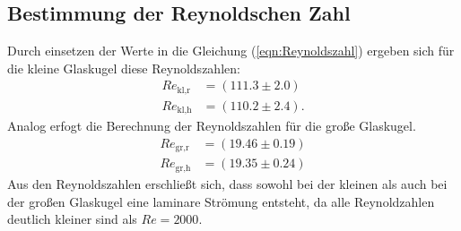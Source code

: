 \subsection{Bestimmung der Reynoldschen Zahl}
Durch einsetzen der Werte in die Gleichung (\ref{eqn:Reynoldszahl}) ergeben sich für die 
kleine Glaskugel diese Reynoldszahlen:
\begin{align*}
  Re_{\text{kl,r}} &= \left(111.3\pm2.0\right)\\
  Re_{\text{kl,h}} &= \left(110.2\pm2.4\right).
\end{align*}
Analog erfogt die Berechnung der Reynoldszahlen für die große Glaskugel.
\begin{align*}
  Re_{\text{gr,r}} &= \left(19.46\pm0.19\right)\\
  Re_{\text{gr,h}} &= \left(19.35\pm0.24\right)
\end{align*}
Aus den Reynoldszahlen erschließt sich, dass sowohl bei der kleinen als auch bei der großen Glaskugel
eine laminare Strömung entsteht, da alle Reynoldzahlen deutlich kleiner sind als $Re=2000$.
%
